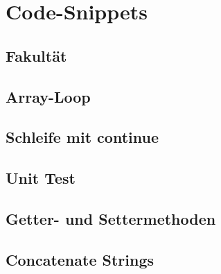 \section{Code-Snippets}

\subsection{Fakultät}
    

\subsection{Array-Loop}{\label{Array-Loop}}
    

\subsection{Schleife mit continue}
    

\subsection{Unit Test}{\label{Unit-Test}}
    

\subsection{Getter- und Settermethoden}{\label{GetSet}}
    

\subsection{Concatenate Strings}
    
